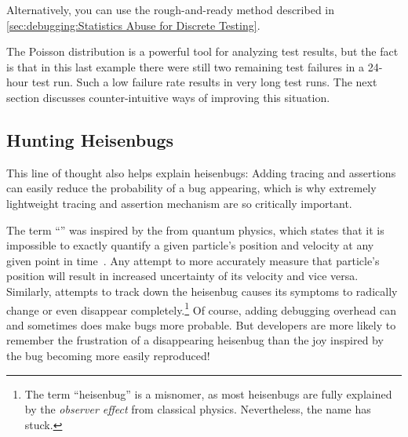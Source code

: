 {{	Alternatively, you can use the rough-and-ready method described in
	\cref{sec:debugging:Statistics Abuse for Discrete Testing}.
}\QuickQuizEndB
%
\QuickQuizEndE
}

The Poisson distribution is a powerful tool for analyzing test results,
but the fact is that in this last example there were still two remaining
test failures in a 24-hour test run.
Such a low failure rate results in very long test runs.
The next section discusses counter-intuitive ways of improving this situation.

\subsection{Hunting Heisenbugs}
\label{sec:debugging:Hunting Heisenbugs}

This line of thought also helps explain heisenbugs:
Adding tracing and assertions can easily reduce the probability
of a bug appearing, which
is why extremely lightweight tracing and assertion mechanism are
so critically important.

The term ``'' was inspired by the 
 from quantum physics, which states that
it is impossible to
exactly quantify a given particle's position and velocity at any given
point in time~\cite{WeinerHeisenberg1927Uncertain}.
Any attempt to more accurately measure that particle's position will
result in increased uncertainty of its velocity and vice versa.
Similarly, attempts to track down
the heisenbug causes its symptoms to radically change or even disappear
completely.\footnote{
	The term ``heisenbug'' is a misnomer, as most heisenbugs are
	fully explained by the \emph{observer effect} from classical
	physics.
	Nevertheless, the name has stuck.}
Of course, adding debugging overhead can and sometimes does make bugs
more probable.
But developers are more likely to remember the frustration of a
disappearing heisenbug than the joy inspired by the bug becoming
more easily reproduced!

